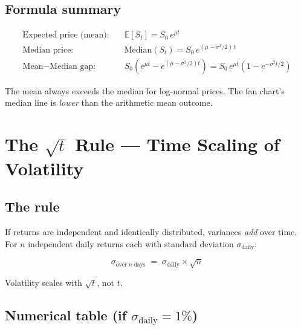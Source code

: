 \documentclass[11pt, a4paper]{article}
\newcommand{\E}{\mathbb{E}}
\begin{document}
\subsection*{Formula summary}

\begin{tcolorbox}[mathbox]
\begin{align*}
  \text{Expected price (mean):}\quad & \E[S_t] = S_0\, e^{\mu t} \\
  \text{Median price:}\quad & \text{Median}(S_t) = S_0\, e^{(\mu - \sigma^2/2)\, t} \\
  \text{Mean} - \text{Median gap:}\quad & S_0\left(e^{\mu t} - e^{(\mu-\sigma^2/2)t}\right) = S_0\, e^{\mu t}\!\left(1 - e^{-\sigma^2 t/2}\right)
\end{align*}
\end{tcolorbox}

The mean always exceeds the median for log-normal prices. The fan chart's median line is \emph{lower} than the arithmetic mean outcome.

\section{The $\sqrt{t}$ Rule — Time Scaling of Volatility}
\label{sec:sqrtt}

\subsection*{The rule}

If returns are independent and identically distributed, variances \emph{add} over time. For $n$ independent daily returns each with standard deviation $\sigma_{\text{daily}}$:

\[
  \sigma_{\text{over}\; n\;\text{days}} \;=\; \sigma_{\text{daily}} \times \sqrt{n}
\]

Volatility scales with $\sqrt{t}$, not $t$.

\subsection*{Numerical table (if $\sigma_{\text{daily}} = 1\%$)}
\end{document}
